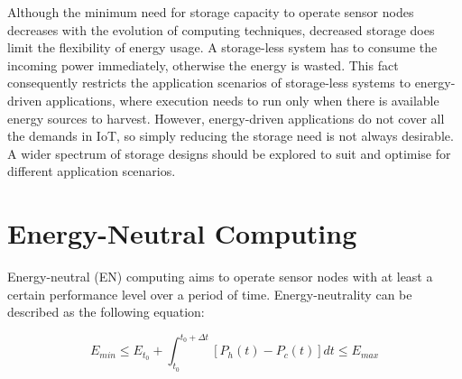 Although the minimum need for storage capacity to operate sensor nodes decreases with the evolution of computing techniques, decreased storage does limit the flexibility of energy usage. A storage-less system has to consume the incoming power immediately, otherwise the energy is wasted. This fact consequently restricts the application scenarios of storage-less systems to energy-driven applications, where execution needs to run only when there is available energy sources to harvest. However, energy-driven applications do not cover all the demands in IoT, so simply reducing the storage need is not always desirable. A wider spectrum of storage designs should be explored to suit and optimise for different application scenarios.


\section{Energy-Neutral Computing} \label{Section:EN}

Energy-neutral (EN) computing aims to operate sensor nodes with at least a certain performance level over a period of time. Energy-neutrality can be described as the following equation:

\begin{equation} \label{eq:energyneutral}
    E_{min} \leq E_{t_0} + \int_{t_0}^{t_0+\Delta t} [P_h(t) - P_c(t)] dt \leq E_{max}
\end{equation} 


